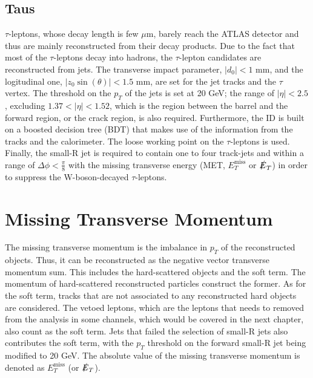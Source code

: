 \documentclass[class=NCU_thesis, crop=false]{standalone}
\begin{document}
	\subsection{Taus}
		$\tau$-leptons, whose decay length is few $\mu$m, barely reach the ATLAS detector and thus are mainly reconstructed from their decay products. Due to the fact that most of the $\tau$-leptons decay into hadrons, the $\tau$-lepton candidates are reconstructed from jets. The transverse impact parameter, $\lvert d_0 \rvert < 1$ mm, and the logitudinal one, $\lvert z_0 \sin(\theta) \rvert < 1.5$ mm, are set for the jet tracks and the $\tau$ vertex. The threshold on the $p_T$ of the jets is set at 20 GeV; the range of $\lvert \eta \rvert < 2.5$, excluding $1.37 < \lvert \eta \rvert < 1.52$, which is the region between the barrel and the forward region, or the crack region, is also required. Furthermore, the ID is built on a boosted decision tree (BDT) that makes use of the information from the tracks and the calorimeter. The loose working point on the $\tau$-leptons is used. Finally, the small-R jet is required to contain one to four track-jets and within a range of $\Delta \phi < \frac{\pi}{8}$ with the missing transverse energy (MET, $E_T^{\mathrm{miss}}$ or $\slashed{E}_T$) in order to suppress the W-boson-decayed $\tau$-leptons.
	
\section{Missing Transverse Momentum}
	The missing transverse momentum is the imbalance in $p_T$ of the reconstructed objects. Thus, it can be reconstructed as the negative vector transverse momentum sum. This includes the hard-scattered objects and the soft term. The momentum of hard-scattered reconstructed particles construct the former. As for the soft term, tracks that are not associated to any reconstructed hard objects are considered. The vetoed leptons, which are the leptons that needs to removed from the analysis in some channels, which would be covered in the next chapter, also count as the soft term. Jets that failed the selection of small-R jets also contributes the soft term, with the $p_T$ threshold on the forward small-R jet being modified to 20 GeV. The absolute value of the missing transverse momentum is denoted as $E_T^{\mathrm{miss}}$ (or $\slashed{E}_T$).
	
\end{document}
